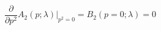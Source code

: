 \begin{equation}
\frac{\partial}{\partial p^2} A_2 (p; \lambda) \Big|_{p^2=0} = B_2
(p=0; \lambda) = 0 \label{scaleconvention}
\end{equation}

